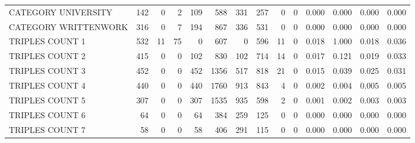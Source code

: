 \begin{tabular}{lrrrrrrrrrllll}
 CATEGORY UNIVERSITY      &             142 &             0 &               2 &             109 &             588 &  331 &  257 &    0 &    0 & 0.000 & 0.000 & 0.000 & 0.000 \\
 CATEGORY WRITTENWORK     &             316 &             0 &               7 &             194 &             867 &  336 &  531 &    0 &    0 & 0.000 & 0.000 & 0.000 & 0.000 \\
 TRIPLES COUNT 1          &             532 &            11 &              75 &               0 &             607 &    0 &  596 &   11 &    0 & 0.018 & 1.000 & 0.018 & 0.036 \\
 TRIPLES COUNT 2          &             415 &             0 &               0 &             102 &             830 &  102 &  714 &   14 &    0 & 0.017 & 0.121 & 0.019 & 0.033 \\
 TRIPLES COUNT 3          &             452 &             0 &               0 &             452 &            1356 &  517 &  818 &   21 &    0 & 0.015 & 0.039 & 0.025 & 0.031 \\
 TRIPLES COUNT 4          &             440 &             0 &               0 &             440 &            1760 &  913 &  843 &    4 &    0 & 0.002 & 0.004 & 0.005 & 0.005 \\
 TRIPLES COUNT 5          &             307 &             0 &               0 &             307 &            1535 &  935 &  598 &    2 &    0 & 0.001 & 0.002 & 0.003 & 0.003 \\
 TRIPLES COUNT 6          &              64 &             0 &               0 &              64 &             384 &  259 &  125 &    0 &    0 & 0.000 & 0.000 & 0.000 & 0.000 \\
 TRIPLES COUNT 7          &              58 &             0 &               0 &              58 &             406 &  291 &  115 &    0 &    0 & 0.000 & 0.000 & 0.000 & 0.000 \\
\hline
\end{tabular}